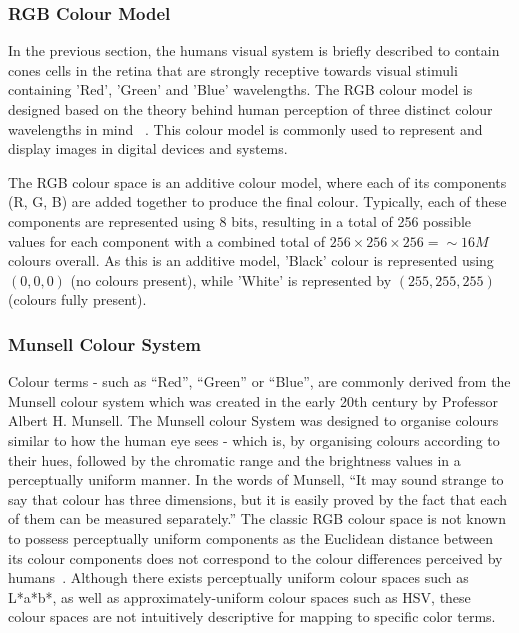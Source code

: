 \vspace{1em}
\subsubsection{RGB Colour Model}
In the previous section, the humans visual system is briefly described to contain 
cones cells in the retina that are strongly receptive towards visual stimuli containing 'Red', 'Green' and 'Blue' wavelengths.
The RGB colour model is designed based on the theory behind human perception
of three distinct colour wavelengths in mind ~\cite{travis1991effective, young1802ii}. This colour model is commonly used to represent and display images in digital devices and systems.

The RGB colour space is an additive colour model, where each of its
components (R, G, B) are added together to produce the final colour. Typically, each of these components are represented using 8 bits, resulting in a total of 256 possible values
for each component with a combined total of $256 \times 256 \times 256 = \sim 16M$ colours overall. As this is an additive model, 'Black' colour is
represented using $(0, 0, 0)$ (no colours present), while 'White' is represented by $(255, 255, 255)$ (colours fully present). 



\vspace{1em}
\subsubsection{Munsell Colour System}
\label{section:munsellcs}
Colour terms - such as ``Red'', ``Green'' or ``Blue'', are commonly derived from
the Munsell colour system which was created in the early 20th century by
Professor Albert H. Munsell. The Munsell colour System was designed to organise colours similar to how the human eye sees - which is, by
organising colours according to their hues, followed by the chromatic range
and the brightness values in a perceptually uniform manner. In the words of
Munsell, ``It may sound strange to say that colour has three dimensions, but it
is easily proved by the fact that each of them can be measured separately.''
The classic RGB colour space is not known to possess perceptually uniform components as the Euclidean distance between its colour components does not correspond to the colour differences perceived by humans~\cite{paschos2001perceptually}. Although there exists perceptually uniform colour spaces such as L*a*b*, as well as approximately-uniform colour spaces such as HSV, these colour spaces are not intuitively descriptive for mapping to specific color terms.

